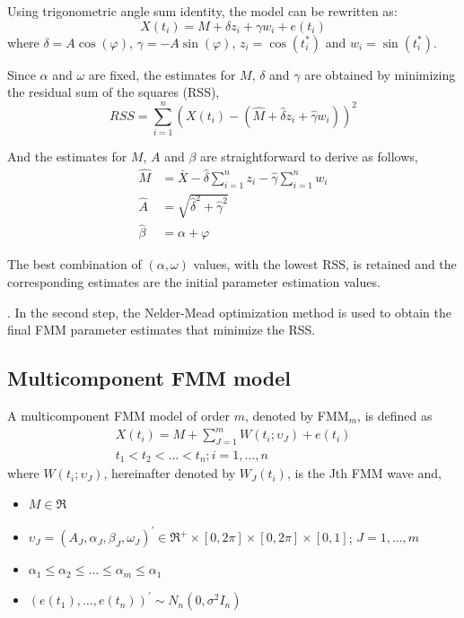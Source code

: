 Using trigonometric angle sum identity, the model can be rewritten as:
%
\begin{equation} \label{eq:monoFMM:reWrite}
  X\left(t_i\right) = M + \delta z_i + \gamma w_i + e\left(t_i\right) 
\end{equation}
%
where $\delta = A \cos\left(\varphi \right)$, $\gamma = -A \sin\left(\varphi \right)$, $z_i = \cos\left(t_i^*\right)$ and $w_i = \sin\left(t_i^*\right)$.

Since $\alpha$ and $\omega$ are fixed, the estimates for $M$, $\delta$ and $\gamma$ are obtained by minimizing the residual sum of the squares (RSS),
%
\begin{equation} \label{eq:monoFMM:SSR}
  RSS = \sum_{i=1}^{n} \left(X\left(t_i\right)-\left(\hat{M} + \hat{\delta} z_i + \hat{\gamma} w_i\right)\right)^2 
\end{equation}
% 

And the estimates for $M$, $A$ and $\beta$ are straightforward to derive as follows,
%
\begin{align} \label{eq:monoFMM:estimates}
  \hat{M} & = \bar{X} - \hat{\delta} \sum_{i=1}^{n} z_i - \hat{\gamma} \sum_{i=1}^{n} w_i\\
  \hat{A} & = \sqrt{\hat{\delta}^2 + \hat{\gamma}^2}  \\
  \hat{\beta} & = \alpha + \varphi  
\end{align}
% 

The best combination of $\left(\alpha, \omega \right)$ values, with the lowest RSS, is retained and the corresponding estimates are the initial parameter estimation values.

. In the second step, the Nelder-Mead optimization method \citep{Nelder+Mead:1965} is used to obtain the final FMM parameter estimates that minimize the RSS.

\subsection{Multicomponent FMM model} \label{subsec:multiFMM}
A multicomponent FMM model of order $m$, denoted by FMM$_m$, is defined as
%
\begin{align} \label{eq:multiFMM}
   X\left(t_i \right) = M + \sum_{J=1}^{m}W\left(t_i; \upsilon_J \right) + e\left(t_i\right) \\
   t_1 < t_2 < \dots < t_n; i = 1, \dots, n  \nonumber
\end{align} 
%
where $W\left(t_i; \upsilon_J\right)$, hereinafter denoted by $W_J\left(t_i\right)$, is the Jth FMM wave and,
%
\begin{itemize}
  \item $M \in \Re$
  \item $ \upsilon_J = \left(A_J, \alpha_J, \beta_J, \omega_J \right)^{\prime} \in  \Re^{+} \times \left[0,2\pi \right] \times \left[0,2\pi\right] \times \left[0,1\right]$; $J = 1, \dots ,m$ 
  \item $ \alpha_1 \leq \alpha_2 \leq \dots \leq \alpha_m \leq \alpha_1$
  \item $\left(e\left(t_1\right), \dots , e\left(t_n\right)\right)^{\prime} \sim N_n\left(0, \sigma^2I_n\right) $
\end{itemize}

